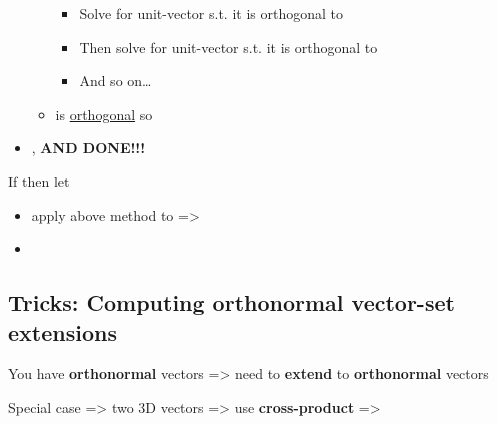 \begin{itemize}
\begin{itemize}
\begin{itemize}
                              \item
                                    Solve for unit-vector  s.t. it is
                                    orthogonal to 
                              \item
                                    Then solve for unit-vector  s.t. it is
                                    orthogonal to 
                              \item
                                    And so on\ldots{}
                        \end{itemize}
                  \item
                        is \underline{orthogonal} so 
            \end{itemize}
      \item
            ,
            \textbf{AND DONE!!!}
\end{itemize}

If  then let 
\begin{itemize}

      \item
            apply above method to  =\textgreater{}
      \item
\end{itemize}



\subsection*{Tricks: Computing orthonormal vector-set extensions}

You have \textbf{orthonormal} vectors
=\textgreater{} need to \textbf{extend} to \textbf{orthonormal}
vectors

Special case =\textgreater{} two 3D vectors =\textgreater{} use
\textbf{cross-product} =\textgreater{} 

\hSep %

